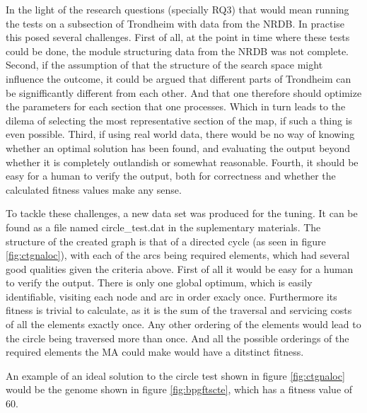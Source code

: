 In the light of the research questions (specially RQ3) that would mean running the tests on a subsection of Trondheim with data from the NRDB. In practise this posed several challenges. First of all, at the point in time where these tests could be done, the module structuring data from the NRDB was not complete. Second, if the assumption of that the structure of the search space might influence the outcome, it could be argued that different parts of Trondheim can be signifficantly different from each other. And that one therefore should optimize the parameters for each section that one processes. Which in turn leads to the dilema of selecting the most representative section of the map, if such a thing is even possible. Third, if using real world data, there would be no way of knowing whether an optimal solution has been found, and evaluating the output beyond whether it is completely outlandish or somewhat reasonable. Fourth, it should be easy for a human to verify the output, both for correctness and whether the calculated fitness values make any sense.

To tackle these challenges, a new data set was produced for the tuning. It can be found as a file named circle\_test.dat in the suplementary materials. The structure of the created graph is that of a directed cycle (as seen in figure \ref{fig:ctgnaloc}), with each of the arcs being required elements, which had several good qualities given the criteria above. First of all it would be easy for a human to verify the output. There is only one global optimum, which is easily identifiable, visiting each node and arc in order exacly once. Furthermore its fitness is trivial to calculate, as it is the sum of the traversal and servicing costs of all the elements exactly once. Any other ordering of the elements would lead to the circle being traversed more than once. And all the possible orderings of the required elements the MA could make would have a ditstinct fitness.

An example of an ideal solution to the circle test shown in figure \ref{fig:ctgnaloc} would be the genome shown in figure \ref{fig:bpgftscte}, which has a fitness value of 60.

